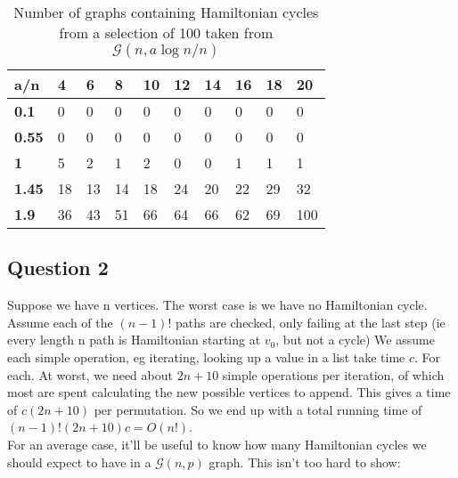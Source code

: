 \documentclass[10pt,a4paper]{report}
\begin{document}
\begin{table}[ht]
\centering
\begin{tabular}{|l|l|l|l|l|l|l|l|l|l|}
\hline
\textbf{a/n}  & \textbf{4} & \textbf{6} & \textbf{8} & \textbf{10} & \textbf{12} & \textbf{14} & \textbf{16} & \textbf{18} & \textbf{20} \\ \hline
\textbf{0.1}  & 0          & 0          & 0          & 0           & 0           & 0           & 0           & 0           & 0           \\ \hline
\textbf{0.55} & 0          & 0          & 0          & 0           & 0           & 0           & 0           & 0           & 0           \\ \hline
\textbf{1}    & 5          & 2          & 1          & 2           & 0           & 0           & 1           & 1           & 1           \\ \hline
\textbf{1.45} & 18         & 13         & 14         & 18          & 24          & 20          & 22          & 29          & 32          \\ \hline
\textbf{1.9}  & 36         & 43         & 51         & 66          & 64          & 66          & 62          & 69          & 100         \\ \hline
\end{tabular}
\caption{Number of graphs containing Hamiltonian cycles from a selection of 100 taken from $
\mathcal{G}(n,a\log{n}/n)$}
\label{tab:my-table}
\end{table}

\subsection*{Question 2}
Suppose we have n vertices. The worst case is we have no Hamiltonian cycle. Assume each of the $(n-1)!$ paths are checked, only failing at the last step (ie every length n path is Hamiltonian starting at $v_0$, but not a cycle) We assume each simple operation, eg iterating, looking up a value in a list take time $c$. For each. At worst, we need about $2n+10$ simple operations per iteration, of which most are spent calculating the new possible vertices to append. This gives a time of $c(2n+10)$ per permutation. So we end up with a total running time of $(n-1)!(2n+10)c = O(n!)$.\\

For an average case, it'll be useful to know how many Hamiltonian cycles we should expect to have in a $\mathcal{G}(n,p)$ graph. This isn't too hard to show:
\end{document}
